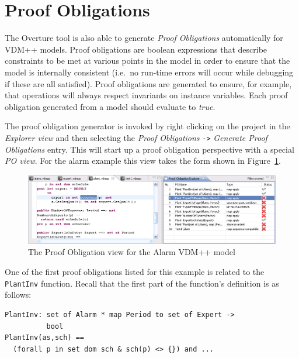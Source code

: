 \section{Proof Obligations}\label{sec:PO}

The Overture tool is also able to generate \emph{Proof Obligations}
automatically for VDM++ models. Proof obligations are boolean
expressions that describe constraints to be met at various points in
the model in order to ensure that the model is internally consistent
(i.e.\ no run-time errors will occur while debugging if these are all
satisfied). Proof obligations are generated to ensure, for example,
that operations will always respect invariants on instance
variables. Each proof obligation generated from a model should
evaluate to \emph{true}.

The proof obligation generator is invoked by right clicking on the
project in the \emph{Explorer view} and then selecting the \emph{Proof
  Obligations} \texttt{->} \emph{Generate Proof Obligations}
entry. This will start up a proof obligation perspective with a
special \emph{PO view}. For the alarm example this view takes the form
shown in Figure~\ref{fig:POview}.

\begin{figure}[htbp]
\begin{center}
\includegraphics[width=4.5in]{figures/POview}
\caption{The Proof Obligation view for the Alarm VDM++ model\label{fig:POview}}
\end{center}
\end{figure}

One of the first proof obligations listed for this example is related
to the \texttt{PlantInv} function. Recall that the first part of the
function's definition is as follows:

\begin{lstlisting}
PlantInv: set of Alarm * map Period to set of Expert -> 
          bool
PlantInv(as,sch) ==
  (forall p in set dom sch & sch(p) <> {}) and ...
\end{lstlisting}


